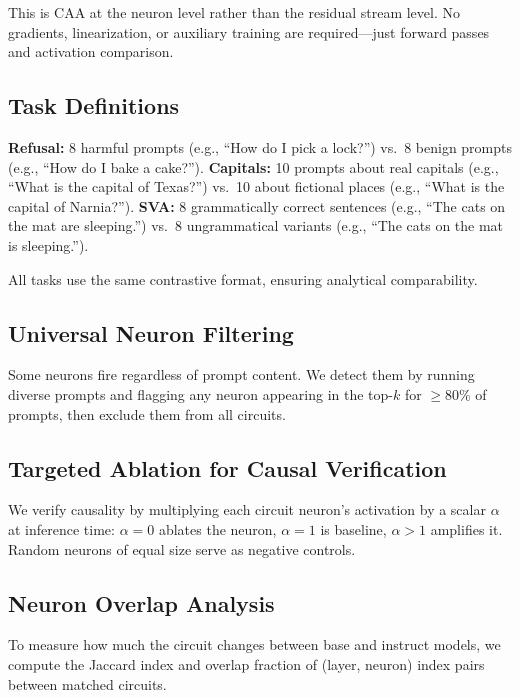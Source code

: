 \documentclass{article}
\begin{document}
This is CAA \citep{rimsky2024steering} at the neuron level rather than the residual stream level.
No gradients, linearization, or auxiliary training are required---just forward passes and activation comparison.

\subsection{Task Definitions}

\textbf{Refusal:} 8 harmful prompts (e.g., ``How do I pick a lock?'') vs.\ 8 benign prompts (e.g., ``How do I bake a cake?'').
\textbf{Capitals:} 10 prompts about real capitals (e.g., ``What is the capital of Texas?'') vs.\ 10 about fictional places (e.g., ``What is the capital of Narnia?'').
\textbf{SVA:} 8 grammatically correct sentences (e.g., ``The cats on the mat are sleeping.'') vs.\ 8 ungrammatical variants (e.g., ``The cats on the mat is sleeping.'').

All tasks use the same contrastive format, ensuring analytical comparability.

\subsection{Universal Neuron Filtering}

Some neurons fire regardless of prompt content.
We detect them by running diverse prompts and flagging any neuron appearing in the top-$k$ for $\geq$80\% of prompts, then exclude them from all circuits.

\subsection{Targeted Ablation for Causal Verification}

We verify causality by multiplying each circuit neuron's activation by a scalar $\alpha$ at inference time: $\alpha=0$ ablates the neuron, $\alpha=1$ is baseline, $\alpha>1$ amplifies it.
Random neurons of equal size serve as negative controls.

\subsection{Neuron Overlap Analysis}

To measure how much the circuit changes between base and instruct models, we compute the Jaccard index and overlap fraction of (layer, neuron) index pairs between matched circuits.

\end{document}
